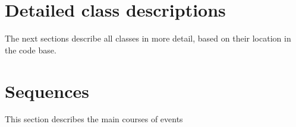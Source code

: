 \section{Detailed class descriptions}

The next sections describe all classes in more detail, based on their location
in the code base.












\section{Sequences}

This section describes the main courses of events







